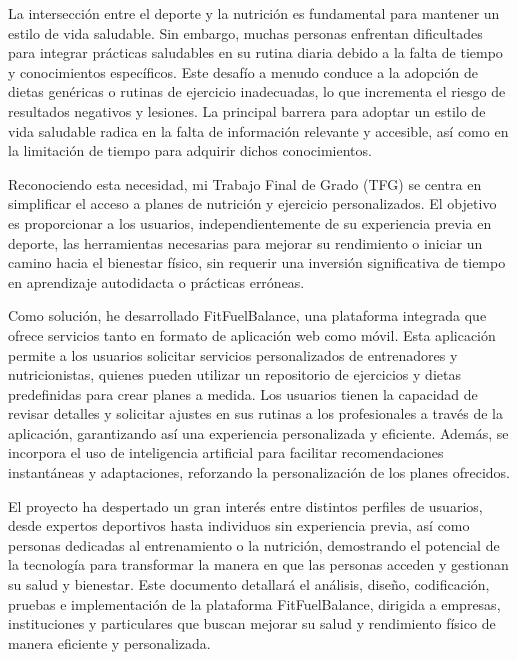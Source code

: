La intersección entre el deporte y la nutrición es fundamental para mantener un estilo de vida saludable. Sin embargo, muchas personas enfrentan dificultades para integrar prácticas saludables en su rutina diaria debido a la falta de tiempo y conocimientos específicos. Este desafío a menudo conduce a la adopción de dietas genéricas o rutinas de ejercicio inadecuadas, lo que incrementa el riesgo de resultados negativos y lesiones. La principal barrera para adoptar un estilo de vida saludable radica en la falta de información relevante y accesible, así como en la limitación de tiempo para adquirir dichos conocimientos.

Reconociendo esta necesidad, mi Trabajo Final de Grado (TFG) se centra en simplificar el acceso a planes de nutrición y ejercicio personalizados. El objetivo es proporcionar a los usuarios, independientemente de su experiencia previa en deporte, las herramientas necesarias para mejorar su rendimiento o iniciar un camino hacia el bienestar físico, sin requerir una inversión significativa de tiempo en aprendizaje autodidacta o prácticas erróneas.

Como solución, he desarrollado FitFuelBalance, una plataforma integrada que ofrece servicios tanto en formato de aplicación web como móvil. Esta aplicación permite a los usuarios solicitar servicios personalizados de entrenadores y nutricionistas, quienes pueden utilizar un repositorio de ejercicios y dietas predefinidas para crear planes a medida. Los usuarios tienen la capacidad de revisar detalles y solicitar ajustes en sus rutinas a los profesionales a través de la aplicación, garantizando así una experiencia personalizada y eficiente. Además, se incorpora el uso de inteligencia artificial para facilitar recomendaciones instantáneas y adaptaciones, reforzando la personalización de los planes ofrecidos.

El proyecto ha despertado un gran interés entre distintos perfiles de usuarios, desde expertos deportivos hasta individuos sin experiencia previa, así como personas dedicadas al entrenamiento o la nutrición, demostrando el potencial de la tecnología para transformar la manera en que las personas acceden y gestionan su salud y bienestar.
Este documento detallará el análisis, diseño, codificación, pruebas e implementación de la plataforma FitFuelBalance, dirigida a empresas, instituciones y particulares que buscan mejorar su salud y rendimiento físico de manera eficiente y personalizada.



